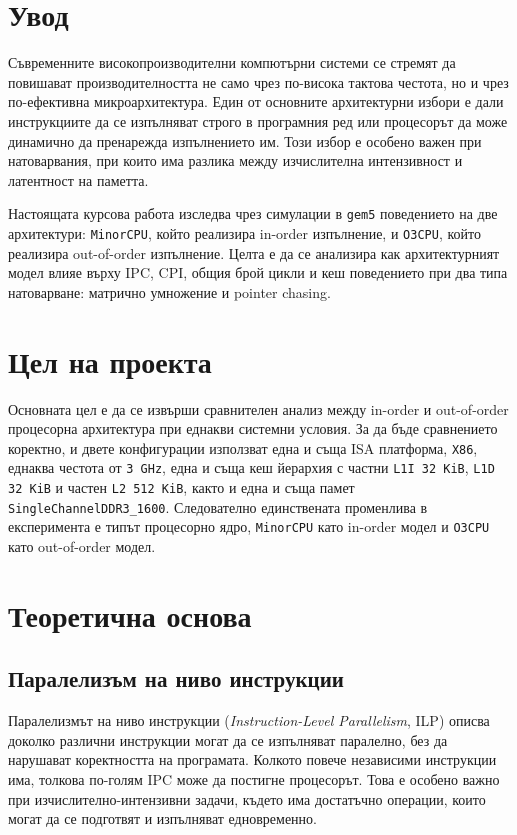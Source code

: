 \documentclass[12pt,a4paper]{article}
\begin{document}
\tableofcontents
\newpage

\section{Увод}
Съвременните високопроизводителни компютърни системи се стремят да повишават производителността не само чрез по-висока тактова честота, но и чрез по-ефективна микроархитектура. Един от основните архитектурни избори е дали инструкциите да се изпълняват строго в програмния ред или процесорът да може динамично да пренарежда изпълнението им. Този избор е особено важен при натоварвания, при които има разлика между изчислителна интензивност и латентност на паметта.

Настоящата курсова работа изследва чрез симулации в \texttt{gem5} поведението на две архитектури: \texttt{MinorCPU}, който реализира in-order изпълнение, и \texttt{O3CPU}, който реализира out-of-order изпълнение. Целта е да се анализира как архитектурният модел влияе върху IPC, CPI, общия брой цикли и кеш поведението при два типа натоварване: матрично умножение и pointer chasing.

\section{Цел на проекта}
Основната цел е да се извърши сравнителен анализ между in-order и out-of-order процесорна архитектура при еднакви системни условия. За да бъде сравнението коректно, и двете конфигурации използват една и съща ISA платформа, \texttt{X86}, еднаква честота от \texttt{3 GHz}, една и съща кеш йерархия с частни \texttt{L1I 32 KiB}, \texttt{L1D 32 KiB} и частен \texttt{L2 512 KiB}, както и една и съща памет \texttt{SingleChannelDDR3\_1600}. Следователно единствената променлива в експеримента е типът процесорно ядро, \texttt{MinorCPU} като in-order модел и \texttt{O3CPU} като out-of-order модел.

\section{Теоретична основа}

\subsection{Паралелизъм на ниво инструкции}
Паралелизмът на ниво инструкции (\emph{Instruction-Level Parallelism}, ILP) описва доколко различни инструкции могат да се изпълняват паралелно, без да нарушават коректността на програмата. Колкото повече независими инструкции има, толкова по-голям IPC може да постигне процесорът. Това е особено важно при изчислително-интензивни задачи, където има достатъчно операции, които могат да се подготвят и изпълняват едновременно.
\end{document}
